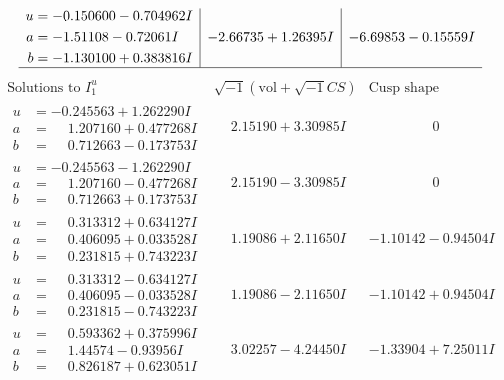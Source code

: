 \documentclass[1p]{elsarticle_modified}
\theoremstyle{definition}
\newcommand{\I}{\sqrt{-1}}
\begin{document}
$$\begin{array}{c|c|c}
\begin{aligned}
u &= -0.150600 - 0.704962 I \\
a &= -1.51108 - 0.72061 I \\
b &= -1.130100 + 0.383816 I\end{aligned}
 & -2.66735 + 1.26395 I & -6.69853 - 0.15559 I\\
 \hline 
 \end{array}$$\newpage$$\begin{array}{c|c|c}  
\text{Solutions to }I^u_{1}& \I (\text{vol} + \sqrt{-1}CS) & \text{Cusp shape}\\
 \hline 
\begin{aligned}
u &= -0.245563 + 1.262290 I \\
a &= \phantom{-}1.207160 + 0.477268 I \\
b &= \phantom{-}0.712663 - 0.173753 I\end{aligned}
 & \phantom{-}2.15190 + 3.30985 I & \phantom{-0.000000 } 0 \\ \hline\begin{aligned}
u &= -0.245563 - 1.262290 I \\
a &= \phantom{-}1.207160 - 0.477268 I \\
b &= \phantom{-}0.712663 + 0.173753 I\end{aligned}
 & \phantom{-}2.15190 - 3.30985 I & \phantom{-0.000000 } 0 \\ \hline\begin{aligned}
u &= \phantom{-}0.313312 + 0.634127 I \\
a &= \phantom{-}0.406095 + 0.033528 I \\
b &= \phantom{-}0.231815 + 0.743223 I\end{aligned}
 & \phantom{-}1.19086 + 2.11650 I & -1.10142 - 0.94504 I \\ \hline\begin{aligned}
u &= \phantom{-}0.313312 - 0.634127 I \\
a &= \phantom{-}0.406095 - 0.033528 I \\
b &= \phantom{-}0.231815 - 0.743223 I\end{aligned}
 & \phantom{-}1.19086 - 2.11650 I & -1.10142 + 0.94504 I \\ \hline\begin{aligned}
u &= \phantom{-}0.593362 + 0.375996 I \\
a &= \phantom{-}1.44574 - 0.93956 I \\
b &= \phantom{-}0.826187 + 0.623051 I\end{aligned}
 & \phantom{-}3.02257 - 4.24450 I & -1.33904 + 7.25011 I \\ \hline\begin{aligned}

\end{aligned}
\end{array}$$
\end{document}
